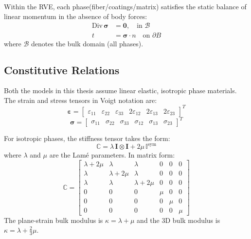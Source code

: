 \documentclass[oneside, 12pt, a4paper, bibliography=totoc]{book}
\newcommand{\bs}[1]{\bm{#1}}                       %
\begin{document}
Within the RVE, each phase(fiber/coatings/matrix) satisfies the static balance of linear momentum in the absence of body forces:
%
\begin{align}
    \text{Div}\,\bs{\sigma} &= \bs{0}, \quad \text{in } \mathcal{B} \\
    t &= \bs{\sigma} \cdot n \quad \text{on } \partial B
    \label{eq:bulk_equilibrium}
\end{align}
%
where $\mathcal{B}$ denotes the bulk domain (all phases).

\subsection{Constitutive Relations}
\label{subsec:constitutive_relations}

Both the models in this thesis assume linear elastic, isotropic phase materials. The strain and stress tensors in Voigt notation are:
%
\begin{equation}
    \bs{\varepsilon} =
    \begin{bmatrix}
        \varepsilon_{11} & \varepsilon_{22} & \varepsilon_{33} & 2\varepsilon_{12} & 2\varepsilon_{13} & 2\varepsilon_{23}
    \end{bmatrix}^T
    \label{eq:strain_voigt}
\end{equation}
%
\begin{equation}
    \bs{\sigma} =
    \begin{bmatrix}
        \sigma_{11} & \sigma_{22} & \sigma_{33} & \sigma_{12} & \sigma_{13} & \sigma_{23}
    \end{bmatrix}^T
    \label{eq:stress_voigt}
\end{equation}

For isotropic phases, the stiffness tensor takes the form:
%
\begin{equation}
    \mathbb{C} = \lambda \, \bs{I} \otimes \bs{I} + 2\mu \, \mathbb{I}^{\text{sym}}
    \label{eq:isotropic_stiffness}
\end{equation}
%
where $\lambda$ and $\mu$ are the Lam\'{e} parameters. In matrix form:
%
\begin{equation}
    \mathbb{C} =
    \begin{bmatrix}
        \lambda + 2\mu & \lambda & \lambda & 0 & 0 & 0 \\
        \lambda & \lambda + 2\mu & \lambda & 0 & 0 & 0 \\
        \lambda & \lambda & \lambda + 2\mu & 0 & 0 & 0 \\
        0 & 0 & 0 & \mu & 0 & 0 \\
        0 & 0 & 0 & 0 & \mu & 0 \\
        0 & 0 & 0 & 0 & 0 & \mu
    \end{bmatrix}
    \label{eq:stiffness_matrix}
\end{equation}
\newpage
The plane-strain bulk modulus is $\kappa = \lambda + \mu$ and the 3D bulk modulus is $\kappa = \lambda + \frac{2}{3}\mu$.
\end{document}
